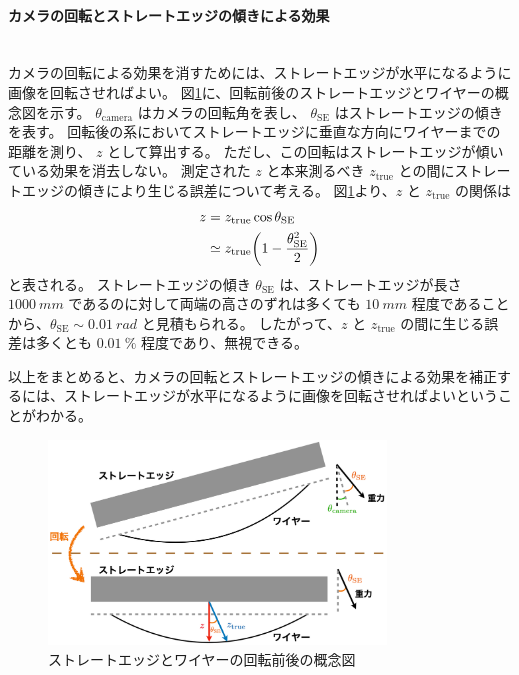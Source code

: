 \documentclass[../../main.tex]{subfiles}
\begin{document}
\paragraph{カメラの回転とストレートエッジの傾きによる効果}\quad\\
\indent
カメラの回転による効果を消すためには、ストレートエッジが水平になるように画像を回転させればよい。
図\ref{fig:wiresag_rotation}に、回転前後のストレートエッジとワイヤーの概念図を示す。
$\theta_{\mathrm{camera}}$ はカメラの回転角を表し、 $\theta_{\mathrm{SE}}$ はストレートエッジの傾きを表す。
回転後の系においてストレートエッジに垂直な方向にワイヤーまでの距離を測り、 $z$ として算出する。
ただし、この回転はストレートエッジが傾いている効果を消去しない。
測定された $z$ と本来測るべき $z_{\mathrm{true}}$ との間にストレートエッジの傾きにより生じる誤差について考える。
図\ref{fig:wiresag_rotation}より、$z$ と $z_{\mathrm{true}}$ の関係は
\begin{align}
    z &= z_{\mathrm{true}}\cos\theta_{\mathrm{SE}} \\
    &\simeq z_{\mathrm{true}}\qty(1-\dfrac{\theta_{\mathrm{SE}}^2}{2})
\end{align}
と表される。
ストレートエッジの傾き $\theta_{\mathrm{SE}}$ は、ストレートエッジが長さ $\SI{1000}{mm}$ 
であるのに対して両端の高さのずれは多くても $\SI{10}{mm}$ 程度であることから、$\theta_{\mathrm{SE}} \sim \SI{0.01}{rad}$ と見積もられる。
したがって、$z$ と $z_{\mathrm{true}}$ の間に生じる誤差は多くとも $\SI{0.01}{\%}$ 程度であり、無視できる。

以上をまとめると、カメラの回転とストレートエッジの傾きによる効果を補正するには、ストレートエッジが水平になるように画像を回転させればよいということがわかる。
\begin{figure}[H]
    \centering
    \includegraphics[width=0.8\textwidth]{wiresag/wiresag_rotation.pdf}
    \caption{ストレートエッジとワイヤーの回転前後の概念図}
    \label{fig:wiresag_rotation}
\end{figure}
\end{document}

